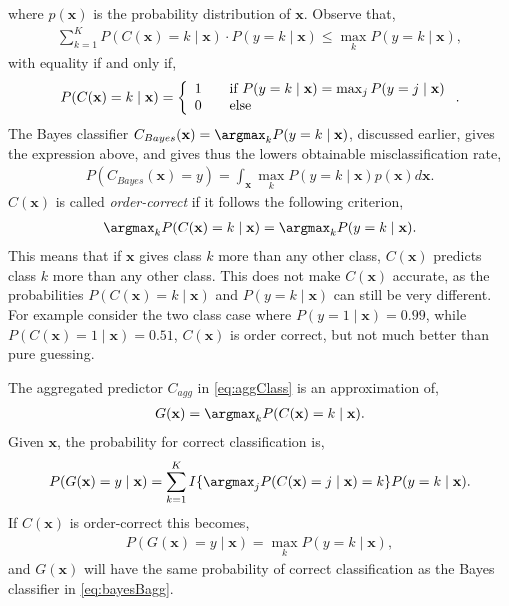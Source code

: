 where $p(\mathbf{x})$ is the probability distribution of $\mathbf{x}$. Observe that, 
\begin{align}
  \sum^{K}_{k=1} P(C(\mathbf{x}) = k \mid \mathbf{x}) \cdot P(y=k \mid \mathbf{x}) \leq \max_k P(y = k \mid \mathbf{x}),
\end{align}
with equality if and only if,
\begin{align}
  P(C(\mathbf{x}) = k \mid \mathbf{x}) = \left\{ 
  \begin{array}{l l}
    1 & \quad \text{if } P(y = k \mid \mathbf{x}) = \max_j P(y = j \mid \mathbf{x})\\
    0 & \quad \text{else}
  \end{array} \right. .
\end{align}
The Bayes classifier $C_{Bayes}(\mathbf{x}) = \argmax_k P(y = k \mid \mathbf{x})$, discussed earlier, gives the expression above, and gives thus the lowers obtainable misclassification rate,
\begin{align}
  \label{eq:bayesBagg} 
  P(C_{Bayes}(\mathbf{x}) = y) = \int_{\mathbf{x}} \max_k P(y=k \mid \mathbf{x})  p(\mathbf{x}) d\mathbf{x}.
\end{align}
$C(\mathbf{x})$ is called \textit{order-correct} if it follows the following criterion,
\begin{align}
  \argmax_k P(C(\mathbf{x}) = k \mid \mathbf{x}) = \argmax_k  P(y = k \mid \mathbf{x}).
\end{align}
This means that if $\mathbf{x}$ gives class $k$ more than any other class, $C(\mathbf{x})$ predicts class $k$ more than any other class. This does not make $C(\mathbf{x})$ accurate, as the probabilities $P(C(\mathbf{x}) = k \mid \mathbf{x}) $ and $P(y = k \mid \mathbf{x})$ can still be very different. For example consider the two class case where $P(y = 1 \mid \mathbf{x})  = 0.99$, while $P(C(\mathbf{x}) = 1\mid \mathbf{x}) = 0.51$, $C(\mathbf{x})$ is order correct, but not much better than pure guessing.

The aggregated predictor $C_{agg}$ in \eqref{eq:aggClass} is an approximation of, 
\begin{align}
  G(\mathbf{x}) = \argmax_k P(C(\mathbf{x})=k \mid \mathbf{x}).
\end{align}
Given $\mathbf{x}$, the probability for correct classification is,
\begin{align}
  P(G(\mathbf{x}) = y \mid \mathbf{x})  
  = \sum^{K}_{k=1} I\{ \argmax_j P(C(\mathbf{x}) = j \mid \mathbf{x}) = k \} P(y=k \mid \mathbf{x}).
\end{align}
If $C(\mathbf{x})$ is order-correct this becomes,
\begin{align}
  P(G(\mathbf{x}) = y \mid \mathbf{x})  = \max_k P(y = k \mid \mathbf{x}),
\end{align}
and $G(\mathbf{x})$ will have the same probability of correct classification as the Bayes classifier in  \eqref{eq:bayesBagg}. 

